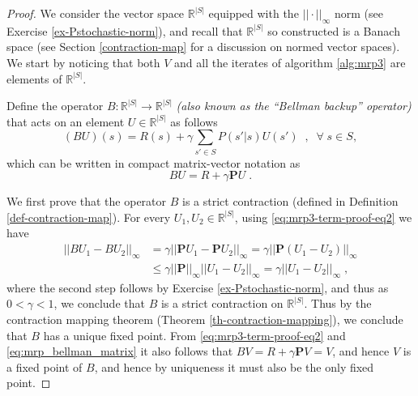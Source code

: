 \documentclass{article}
\theoremstyle{definition}
\theoremstyle{remark}
\begin{document}
\begin{proof}
We consider the vector space $\mathbb{R}^{|S|}$ equipped with the $||\cdot||_{\infty}$ norm (see Exercise \ref{ex-Pstochastic-norm}), and recall that $\mathbb{R}^{|S|}$ so constructed is a Banach space (see Section \ref{contraction-map} for a discussion on normed vector spaces). We start by noticing that both $V$ and all the iterates of algorithm \ref{alg:mrp3} are elements of $\mathbb{R}^{|S|}$.

Define the operator $B : \mathbb{R}^{|S|} \rightarrow \mathbb{R}^{|S|}$ \textit{(also known as the ``Bellman backup'' operator)} that acts on an element $U \in \mathbb{R}^{|S|}$ as follows
\begin{equation}
(BU)(s) = R(s) + \gamma \sum_{s' \in S} P(s'|s)U(s') \;\;,\;\; \forall \; s \in S,
\label{eq:mrp3-term-proof-eq1}
\end{equation}
which can be written in compact matrix-vector notation as 
\begin{equation}
BU = R + \gamma \mathbf{P}U \;.
\label{eq:mrp3-term-proof-eq2}
\end{equation}

We first prove that the operator $B$ is a strict contraction (defined in Definition \ref{def-contraction-map}). For every $U_1, U_2 \in \mathbb{R}^{|S|}$, using \eqref{eq:mrp3-term-proof-eq2} we have
\begin{equation}
\begin{split}
||BU_1 - BU_2||_{\infty} &= \gamma ||\mathbf{P}U_1 - \mathbf{P}U_2||_{\infty} = \gamma ||\mathbf{P}(U_1 - U_2)||_{\infty} \\
& \leq \gamma ||\mathbf{P}||_{\infty} ||U_1 - U_2||_{\infty} = \gamma ||U_1 - U_2||_{\infty} \;,
\end{split}
\label{eq:mrp3-term-proof-eq3}
\end{equation}
where the second step follows by Exercise \ref{ex-Pstochastic-norm}, and thus as $0 < \gamma < 1$, we conclude that $B$ is a strict contraction on $\mathbb{R}^{|S|}$. Thus by the contraction mapping theorem (Theorem \ref{th-contraction-mapping}), we conclude that $B$ has a unique fixed point. From \eqref{eq:mrp3-term-proof-eq2} and \eqref{eq:mrp_bellman_matrix} it also follows that $BV = R + \gamma \mathbf{P}V = V$, and hence $V$ is a fixed point of $B$, and hence by uniqueness it must also be the only fixed point.


\end{proof}
\end{document}
